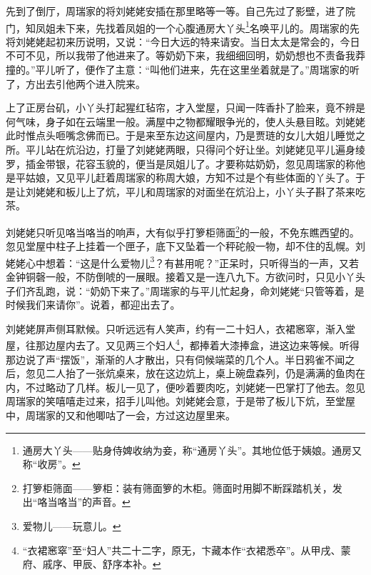 \par 先到了倒厅，周瑞家的将刘姥姥安插在那里略等一等。自己先过了影壁，进了院门，知凤姐未下来，先找着凤姐的一个心腹通房大丫头\footnote{通房大丫头——贴身侍婢收纳为妾，称“通房丫头”。其地位低于姨娘。通房又称“收房”。}名唤平儿的。周瑞家的先将刘姥姥起初来历说明，又说：“今日大远的特来请安。当日太太是常会的，今日不可不见，所以我带了他进来了。等奶奶下来，我细细回明，奶奶想也不责备我莽撞的。”平儿听了，便作了主意：“叫他们进来，先在这里坐着就是了。”周瑞家的听了，方出去引他两个进入院来。
\par 上了正房台矶，小丫头打起猩红毡帘，才入堂屋，只闻一阵香扑了脸来，竟不辨是何气味，身子如在云端里一般。满屋中之物都耀眼争光的，使人头悬目眩。刘姥姥此时惟点头咂嘴念佛而已。于是来至东边这间屋内，乃是贾琏的女儿大姐儿睡觉之所。平儿站在炕沿边，打量了刘姥姥两眼，只得问个好让坐。刘姥姥见平儿遍身绫罗，插金带银，花容玉貌的，便当是凤姐儿了。才要称姑奶奶，忽见周瑞家的称他是平姑娘，又见平儿赶着周瑞家的称周大娘，方知不过是个有些体面的丫头了。于是让刘姥姥和板儿上了炕，平儿和周瑞家的对面坐在炕沿上，小丫头子斟了茶来吃茶。
\par 刘姥姥只听见咯当咯当的响声，大有似乎打箩柜筛面\footnote{打箩柜筛面——箩柜：装有筛面箩的木柜。筛面时用脚不断踩踏机关，发出“咯当咯当”的声音。}的一般，不免东瞧西望的。忽见堂屋中柱子上挂着一个匣子，底下又坠着一个秤砣般一物，却不住的乱幌。刘姥姥心中想着：“这是什么爱物儿\footnote{爱物儿——玩意儿。}？有甚用呢？”正呆时，只听得当的一声，又若金钟铜磬一般，不防倒唬的一展眼。接着又是一连八九下。方欲问时，只见小丫头子们齐乱跑，说：“奶奶下来了。”周瑞家的与平儿忙起身，命刘姥姥“只管等着，是时候我们来请你”。说着，都迎出去了。
\par 刘姥姥屏声侧耳默候。只听远远有人笑声，约有一二十妇人，衣裙窸窣，渐入堂屋，往那边屋内去了。又见两三个妇人\footnote{“衣裙窸窣”至“妇人”共二十二字，原无，卞藏本作“衣裙悉卒”。从甲戌、蒙府、戚序、甲辰、舒序本补。}，都捧着大漆捧盒，进这边来等候。听得那边说了声“摆饭”，渐渐的人才散出，只有伺候端菜的几个人。半日鸦雀不闻之后，忽见二人抬了一张炕桌来，放在这边炕上，桌上碗盘森列，仍是满满的鱼肉在内，不过略动了几样。板儿一见了，便吵着要肉吃，刘姥姥一巴掌打了他去。忽见周瑞家的笑嘻嘻走过来，招手儿叫他。刘姥姥会意，于是带了板儿下炕，至堂屋中，周瑞家的又和他唧咕了一会，方过这边屋里来。
